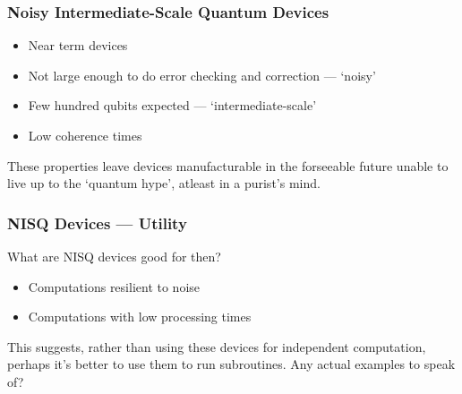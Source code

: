 
\begin{frame}
    \frametitle{Noisy Intermediate-Scale Quantum Devices}

    \begin{itemize}
        \item Near term devices
        \item Not large enough to do error checking and correction --- `noisy'
        \item Few hundred qubits expected --- `intermediate-scale'
        \item Low coherence times
    \end{itemize}

    These properties leave devices manufacturable in the forseeable future
    unable to live up to the `quantum hype', atleast in a purist's mind. 

\end{frame}

\begin{frame}
    \frametitle{NISQ Devices --- Utility}

    What are NISQ devices good for then?

    \begin{itemize}
        \item Computations resilient to noise
        \item Computations with low processing times
    \end{itemize}

    This suggests, rather than using these devices for independent computation,
    perhaps it's better to use them to run subroutines. 
    Any actual examples to speak of?

\end{frame}
